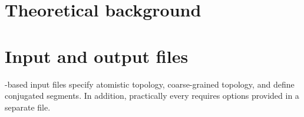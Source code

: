 \documentclass[a4paper,10pt]{book}
\begin{document}
\addtolength{\oddsidemargin}{0cm}
\addtolength{\evensidemargin}{0cm}
\addtolength{\textwidth}{0cm}
\addtolength{\topmargin}{0cm}
\addtolength{\textheight}{0cm}




\frontmatter

\thispagestyle{empty}
\cleardoublepage

\tableofcontents
\mainmatter

\printindex
\vfill

\linenumbers



\chapter{Theoretical background}
\label{sec:theory}










%



\chapter{Input and output files}
\label{sec:io}

\xml-based input files specify atomistic topology, coarse-grained topology, and define conjugated segments. In addition, practically every \calculator requires options provided in a separate \xml file.










\appendix
%


\nolinenumbers



\end{document}
